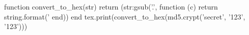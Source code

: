 \documentclass{article}
\begin{document}
\begin{luacode}
function convert_to_hex(str)
    return (str:gsub('.', function (c)
        return string.format('%
    end))
end
tex.print(convert_to_hex(md5.crypt('secret', '123', '123')))
\end{luacode}
\end{document}
